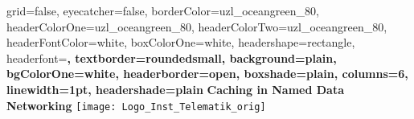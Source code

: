 \documentclass[a0paper,portrait]{baposter}
\begin{document}



\background{
}

\begin{poster}{
		grid=false,
		eyecatcher=false,
		borderColor=uzl_oceangreen_80,
		headerColorOne=uzl_oceangreen_80,
		headerColorTwo=uzl_oceangreen_80,
		headerFontColor=white,
		boxColorOne=white,
		headershape=rectangle,
		headerfont=\large\bf,
		textborder=roundedsmall,
		background=plain,
		bgColorOne=white,
		headerborder=open,
		boxshade=plain,
		columns=6,
		linewidth=1pt,
		headershade=plain
	}
	{
	}
	{
		\vspace{0.3cm}
		\textcolor{uzl_oceangreen_80}{\textbf{Caching in Named Data Networking}}
		\vspace{0.3cm}
	}
	{
		\textcolor{uzl_orange_2}{\textsf{}}
	}
	{
		\hspace{1cm}
		\texttt{[image: Logo\_Inst\_Telematik\_orig]}
	}

	



\end{poster}
\end{document}
